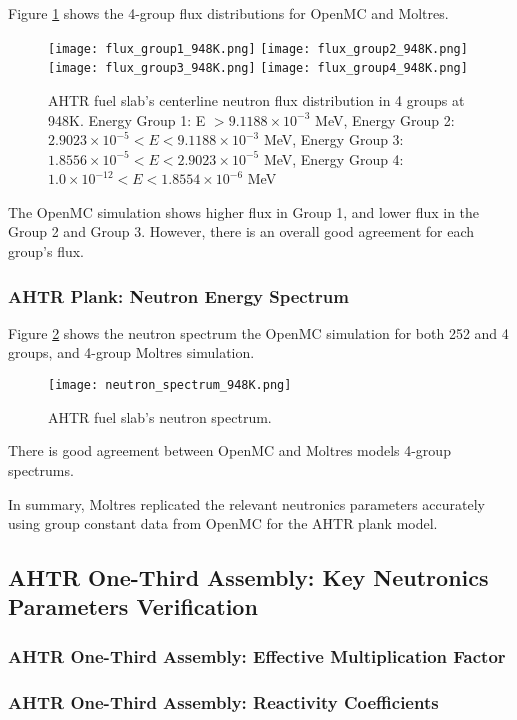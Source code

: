 Figure \ref{fig:flux_948K} shows the 4-group flux distributions for OpenMC and 
Moltres. 
\begin{figure}[]
    \centering
    \texttt{[image: flux\_group1\_948K.png]} 
    \texttt{[image: flux\_group2\_948K.png]} 
    \texttt{[image: flux\_group3\_948K.png]} 
    \texttt{[image: flux\_group4\_948K.png]} 
    \caption{AHTR fuel slab's centerline neutron flux distribution in 4 groups
    at 948K. 
    Energy Group 1: E $> 9.1188 \times 10^{-3}$ MeV, 
    Energy Group 2: $2.9023 \times 10^{-5} < E < 9.1188 \times 10^{-3}$ MeV,
    Energy Group 3:  $1.8556 \times 10^{-5} < E < 2.9023 \times 10^{-5}$ MeV,
    Energy Group 4:  $1.0 \times 10^{-12} < E < 1.8554 \times 10^{-6}$ MeV}
    \label{fig:flux_948K}
\end{figure}
The OpenMC simulation shows higher flux in Group 1, and lower flux in the
Group 2 and Group 3. 
However, there is an overall good agreement for each group's flux.  

\subsubsection{AHTR Plank: Neutron Energy Spectrum}
Figure \ref{fig:neutron_spectrum_948K} shows the neutron spectrum the OpenMC simulation 
for both 252 and 4 groups, and 4-group Moltres simulation. 
 \begin{figure}[]
    \centering
    \texttt{[image: neutron\_spectrum\_948K.png]}
    \caption{AHTR fuel slab's neutron spectrum.}  
    \label{fig:neutron_spectrum_948K}
\end{figure}
There is good agreement between OpenMC and Moltres models 4-group spectrums. 

In summary, Moltres replicated the relevant neutronics parameters accurately 
using group constant data from OpenMC for the \gls{AHTR} plank model. 

\subsection{AHTR One-Third Assembly: Key Neutronics Parameters Verification}

\subsubsection{AHTR One-Third Assembly: Effective Multiplication Factor}
\subsubsection{AHTR One-Third Assembly: Reactivity Coefficients}
